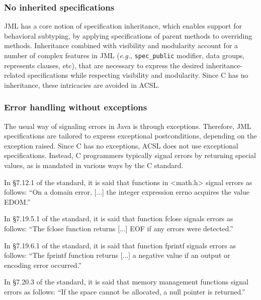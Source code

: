 \subsubsection*{No inherited specifications}

JML has a core notion of specification inheritance, which
enables support for behavioral subtyping, by applying
 specifications of parent methods to overriding methods.  Inheritance
combined with visibility and modularity account for a number of
complex features in JML (\emph{e.g.}, \verb|spec_public| modifier, data
groups, represents clauses, etc), that are necessary to express the
desired inheritance-related specifications while respecting visibility
and modularity. Since C has no inheritance, these intricacies are
avoided in ACSL.

\subsubsection*{Error handling without exceptions}
\label{sec:errorhandling}

The usual way of signaling errors in Java is through
exceptions. Therefore, JML specifications are tailored to express
exceptional postconditions, depending on the exception raised. Since C
has no exceptions, ACSL does not use exceptional
specifications. Instead, C programmers typically signal errors by
returning special values, as is mandated in various ways by the C standard.

\begin{example}
In \S 7.12.1 of the standard, it is said that functions in <math.h>
signal errors as follows:
``On a domain error, [...] the integer expression errno
acquires the value EDOM.''
\end{example}

\begin{example}
In \S 7.19.5.1 of the standard, it is said that function fclose signals
errors as follows:
``The fclose function returns [...] EOF if any errors were detected.''
\end{example}

\begin{example}
In \S 7.19.6.1 of the standard, it is said that function fprintf
signals errors as follows:
``The fprintf function returns [...] a negative value if an output or
encoding error occurred.''
\end{example}

\begin{example}
In \S 7.20.3 of the standard, it is said that memory management functions
signal errors as follows:
``If the space cannot be allocated, a null pointer is returned.''
\end{example}


